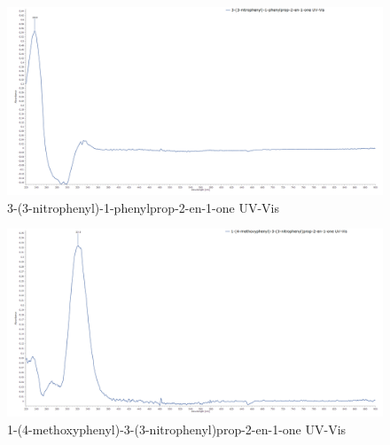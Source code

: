 \documentclass[12pt]{article}
\begin{document}
\newpage
\begin{figure}[H]
    \centering
    \includegraphics[scale=0.234]{spectra/uvvis7.1.png}
    \caption{3-(3-nitrophenyl)-1-phenylprop-2-en-1-one UV-Vis}
\end{figure}
\begin{figure}[H]
    \centering
    \includegraphics[scale=0.234]{spectra/uvvis7.2.png}
    \caption{1-(4-methoxyphenyl)-3-(3-nitrophenyl)prop-2-en-1-one UV-Vis}
\end{figure}

\newpage
\end{document}
